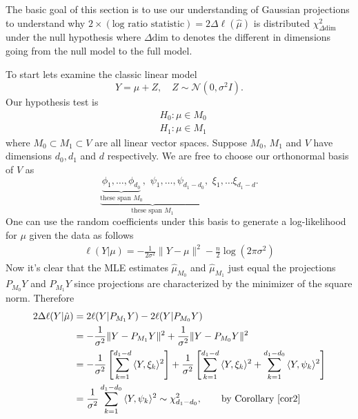 \documentclass[11pt]{report}
\begin{document}
The basic goal of this section is to use our understanding of Gaussian projections to understand why $2\times(\text{log ratio statistic})= 2\Delta \ell(\hat \mu)$ is distributed $\chi^2_{\Delta \text{dim}}$ under the null hypothesis where $\Delta \text{dim}$ to denotes the different in dimensions going from the null model to the full model.

To start lets examine the classic linear model
\[Y = \mu + Z,\quad Z\sim\mathcal N(0,\sigma^2I). \]
Our hypothesis test is
\begin{align*}
&H_0: \mu\in M_0\\
&H_1: \mu \in M_1
\end{align*}
where $M_0\subset M_1 \subset V$ are all linear vector spaces. Suppose $M_0$, $M_1$ and $V$ have dimensions $d_0, d_1$ and $d$ respectively. We are free to choose our orthonormal basis of $V$ as 
\[\underbrace{\underbrace{\phi_1,\ldots, \phi_{d_0}}_{\text{these span $M_0$}},\,\, \psi_{1},\ldots, \psi_{d_1 - d_0}}_{\text{these span $M_1$}},\,\, \xi_1,\ldots \xi_{d_1 - d}.\]
One can use the random coefficients under this basis to generate a log-likelihood for $\mu$ given the data as follows 
\begin{align*}
\ell(Y|\mu) =-\frac{1}{2\sigma^2} \|Y - \mu \|^2 - \frac{n}{2}\log(2\pi\sigma^{2})
\end{align*}
Now it's clear that the MLE estimates $\hat\mu_{M_0}$ and $ \hat\mu_{M_1}$ just equal the projections $P_{M_0}Y$ and $P_{M_1}Y$ since projections are characterized by the minimizer of the square norm. Therefore
\begin{align*}
2\Delta \ell(Y|\hat\mu) &= 2\ell(Y|P_{M_1}Y) - 2\ell(Y|P_{M_0}Y) \\
 &= -\frac{1}{\sigma^2} \|Y - P_{M_1}Y \|^2 + \frac{1}{\sigma^2} \|Y - P_{M_0}Y \|^2 \\
 &= -\frac{1}{\sigma^2} \left[\sum_{k=1}^{d_1-d}{\langle Y,\xi_k \rangle^2}\right] + \frac{1}{\sigma^2}  \left[ \sum_{k=1}^{d_1-d}{\langle Y,\xi_k \rangle^2}+  \sum_{k=1}^{d_1-d_0}{\langle Y,\psi_k \rangle^2}\right] \\
 &= \frac{1}{\sigma^2}  \sum_{k=1}^{d_1-d_0}{\langle Y,\psi_k \rangle^2} \sim \chi^2_{d_1 - d_0}, \qquad \text{by Corollary \ref{cor2}}
\end{align*}
\end{document}

